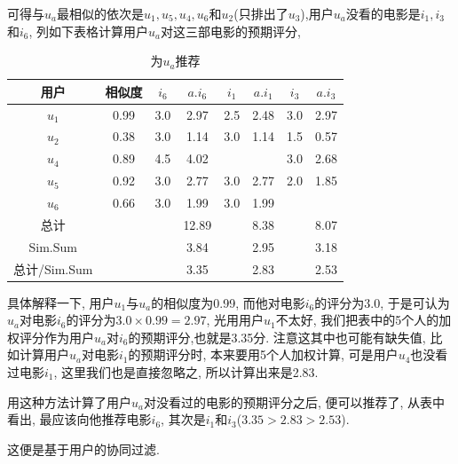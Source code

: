 \documentclass[a4paper,UTF8]{ctexart}
\theoremstyle{plain} \newtheorem{theorem}{定理}[section]
\theoremstyle{plain} \newtheorem{definition}{定义}[section]
\theoremstyle{plain} \newtheorem{lemma}{引理}[section]
\theoremstyle{plain} \newtheorem{proposition}{命题}[section]
\theoremstyle{plain} \newtheorem{example}{例}[section]
\theoremstyle{plain} \newtheorem{remark}{注}[section]
\theoremstyle{plain} \newtheorem{corollary}{推论}[section]
\begin{document}
可得与$u_a$最相似的依次是$u_1,u_5,u_4,u_6$和$u_2$(只排出了$u_3$),用户$u_a$没看的电影是$i_1,i_3$和$i_6$, 列如下表格计算用户$u_a$对这三部电影的预期评分,
\begin{table}[!htb]
\centering
\caption{为$u_a$推荐}
\label{recommendua}
\begin{tabular}{c|c|c|c|c|c|c|c}
	\hline
    用户 & 相似度 & $i_6$ & $a.i_6$ & $i_1$ & $a.i_1$ & $i_3$ & $a.i_3$  \\
    \hline
    $u_1$ & 0.99 & 3.0 & 2.97 & 2.5 & 2.48 & 3.0 & 2.97 \\
    \hline
    $u_2$ & 0.38 & 3.0 & 1.14 & 3.0 & 1.14 & 1.5 & 0.57 \\
    \hline
    $u_4$ & 0.89 & 4.5 & 4.02 &     &      & 3.0 & 2.68 \\
    \hline
    $u_5$ & 0.92 & 3.0 & 2.77 & 3.0 & 2.77 & 2.0 & 1.85 \\ 
    \hline
    $u_6$ & 0.66 & 3.0 & 1.99 & 3.0 & 1.99 &     &      \\ 
    \hline
    总计   &      &     & 12.89 &  & 8.38 &  & 8.07 \\
    \hline 
    Sim.Sum &    &     &  3.84  &  & 2.95 &  & 3.18 \\ 
    \hline
    总计/Sim.Sum &  &  & 3.35  &  & 2.83  &  &  2.53 \\    
	\hline
\end{tabular}
\end{table}

具体解释一下, 用户$u_1$与$u_a$的相似度为0.99, 而他对电影$i_6$的评分为$3.0$, 于是可认为$u_a$对电影$i_6$的评分为$3.0 \times 0.99 = 2.97$, 光用用户$u_1$不太好, 我们把表中的5个人的加权评分作为用户$u_a$对$i_6$的预期评分,也就是3.35分. 注意这其中也可能有缺失值, 比如计算用户$u_a$对电影$i_1$的预期评分时, 本来要用5个人加权计算, 可是用户$u_4$也没看过电影$i_1$, 这里我们也是直接忽略之, 所以计算出来是2.83.

用这种方法计算了用户$u_a$对没看过的电影的预期评分之后, 便可以推荐了, 从表中看出, 最应该向他推荐电影$i_6$, 其次是$i_1$和$i_3$($3.35 > 2.83 > 2.53$).

这便是基于用户的协同过滤.
\end{document}
